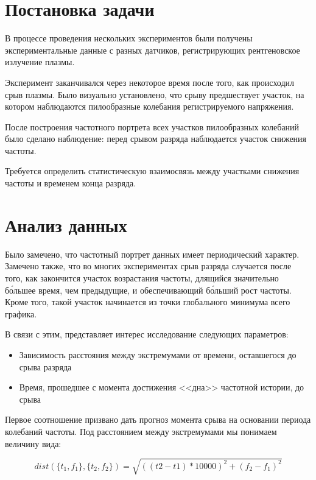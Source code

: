 \section{Постановка задачи}

В процессе проведения нескольких экспериментов были получены экспериментальные данные с разных датчиков, регистрирующих рентгеновское излучение плазмы.

Эксперимент заканчивался через некоторое время после того, как происходил срыв плазмы. Было визуально установлено, что срыву предшествует участок, на котором наблюдаются пилообразные колебания регистрируемого напряжения.

После построения частотного портрета всех участков пилообразных колебаний было сделано наблюдение: перед срывом разряда наблюдается участок снижения частоты.

Требуется определить статистическую взаимосвязь между участками снижения частоты и временем конца разряда.

\section{Анализ данных}\label{analysis}

Было замечено, что частотный портрет данных имеет периодический характер. Замечено также, что во многих экспериментах срыв разряда случается после того, как закончится участок возрастания частоты, длящийся значительно б\'{о}льшее время, чем предыдущие, и обеспечивающий б\'{о}льший рост частоты. Кроме того, такой участок  начинается из точки глобального минимума всего графика.

В связи с этим, представляет интерес исследование следующих параметров:
\begin{itemize}
	\item Зависимость расстояния между экстремумами от времени, оставшегося до срыва разряда
	
	\item Время, прошедшее с момента достижения <<дна>> частотной истории, до срыва
\end{itemize}

Первое соотношение призвано дать прогноз момента срыва на основании периода колебаний частоты. Под расстоянием между экстремумами мы понимаем величину вида:

\begin{equation}
dist(\{t_1, f_1\}, \{t_2, f_2\}) = \sqrt{((t2 - t1) * 10000) ^2 + (f_2 - f_1) ^ 2}
\end{equation}

